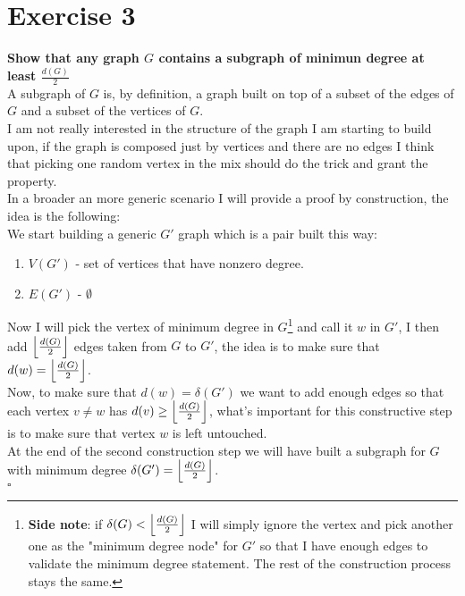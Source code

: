 \section*{Exercise 3}
\boldmath
\textbf{Show that any graph $G$ contains a subgraph of minimun degree at least $\frac{d(G)}{2}$}\vspace{10pt}\\
\unboldmath
A subgraph of $G$ is, by definition, a graph built on top of a subset of the edges of $G$ and a subset of the vertices of $G$.\\
I am not really interested in the structure of the graph I am starting to build upon, if the graph is composed just by vertices and there are no edges I think that picking one random vertex in the mix should do the trick and grant the property.\\
In a broader an more generic scenario I will provide a proof by construction, the idea is the following:\\
We start building a generic $G'$ graph which is a pair built this way:
\begin{enumerate}
    \item $V(G')$ - set of vertices that have nonzero degree.
    \item $E(G')$ - $\emptyset$
\end{enumerate}
Now I will pick the vertex of minimum degree in $G$\footnote{\textbf{Side note}: if $\delta(G) < \left\lfloor\frac{d(G)}{2}\right\rfloor$ I will simply ignore the vertex and pick another one as the "minimum degree node" for $G'$ so that I have enough edges to validate the minimum degree statement. The rest of the construction process stays the same.} and call it $w$ in $G'$, I then add $\left\lfloor\frac{d(G)}{2}\right\rfloor$ edges taken from $G$ to $G'$, the idea is to make sure that $d(w) = \left\lfloor\frac{d(G)}{2}\right\rfloor$.\\
Now, to make sure that $d(w) = \delta(G')$ we want to add enough edges so that each vertex $v \neq w$ has $d(v) \geq \left\lfloor\frac{d(G)}{2}\right\rfloor$, what's important for this constructive step is to make sure that vertex $w$ is left untouched.\\
At the end of the second construction step we will have built a subgraph for $G$ with minimum degree $\delta(G') = \left\lfloor\frac{d(G)}{2}\right\rfloor$.
\vspace{2pt}\\\hspace*{2.5cm}$\square$